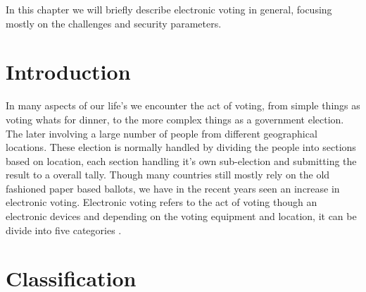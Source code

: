 In this chapter we will briefly describe electronic voting in general, focusing mostly on the challenges and security parameters.

\section{Introduction}
In many aspects of our life's we encounter the act of voting, from simple things as voting whats for dinner, to the more complex things as a government election. The later involving a large number of people from different geographical locations. These election is normally handled by dividing the people into sections based on location, each section handling it's own sub-election and submitting the result to a overall tally. Though many countries still mostly rely on the old fashioned paper based ballots, we have in the recent years seen an increase in electronic voting. Electronic voting refers to the act of voting though an electronic devices and depending on the voting equipment and location, it can be divide into five categories \cite{Cet09}. 

\section{Classification}

